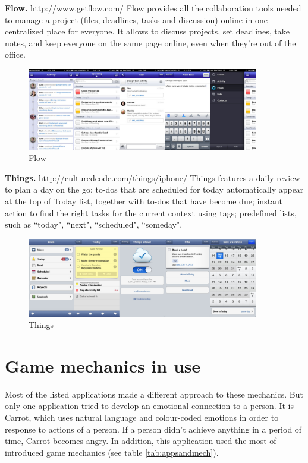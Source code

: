 \textbf{Flow.} \url{http://www.getflow.com/} Flow provides all the collaboration tools needed to manage a project (files, deadlines, tasks and discussion) online in one centralized place for everyone. It allows to discuss projects, set deadlines, take notes, and keep everyone on the same page online, even when they're out of the office.

\begin{figure}
   \centering
	\includegraphics[width=0.9\textwidth]{resources/flow.pdf}
	\caption[Flow]{Flow}
\end{figure}

\textbf{Things.} \url{http://culturedcode.com/things/iphone/} Things features a daily review to plan a day on the go: to-dos that are scheduled for today automatically appear at the top of Today list, together with to-dos that have become due; instant action to find the right tasks for the current context using tags; predefined lists, such as ``today", ``next", ``scheduled", ``someday".

\begin{figure}
   \centering
	\includegraphics[width=0.9\textwidth]{resources/things.pdf}
	\caption[Things]{Things}
\end{figure}

\section{Game mechanics in use}

Most of the listed applications made a different approach to these mechanics. But only one application tried to develop an emotional connection to a person. It is Carrot, which uses natural language and colour-coded emotions in order to response to actions of a person. If a person didn’t achieve anything in a period of time, Carrot becomes angry. In addition, this application used the most of introduced game mechanics (see table \ref{tab:appsandmech}).

